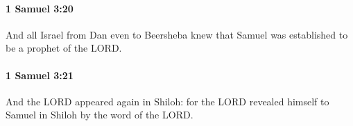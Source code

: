 		\paragraph{1 Samuel 3:20} %
			\label{1SAMUEL-3-20}

			And all Israel from Dan even to Beersheba knew that Samuel was established to be a prophet of the LORD.


		\paragraph{1 Samuel 3:21} %
			\label{1SAMUEL-3-21}

			And the LORD appeared again in Shiloh: for the LORD revealed himself to Samuel in Shiloh by the word of the LORD.


